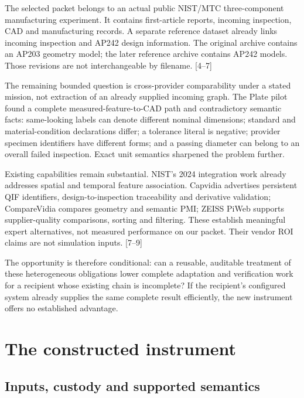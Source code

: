 \documentclass[
  11pt,
]{article}
\let\OriginalSection\section
\renewcommand{\section}{\needspace{5\baselineskip}\OriginalSection}
\let\OriginalSubsection\subsection
\renewcommand{\subsection}{\needspace{6\baselineskip}\OriginalSubsection}
\begin{document}
The selected packet belongs to an actual public NIST/MTC three-component
manufacturing experiment. It contains first-article reports, incoming
inspection, CAD and manufacturing records. A separate reference dataset
already links incoming inspection and AP242 design information. The
original archive contains an AP203 geometry model; the later reference
archive contains AP242 models. Those revisions are not interchangeable
by filename. {[}4--7{]}

The remaining bounded question is cross-provider comparability under a
stated mission, not extraction of an already supplied incoming graph.
The Plate pilot found a complete measured-feature-to-CAD path and
contradictory semantic facts: same-looking labels can denote different
nominal dimensions; standard and material-condition declarations differ;
a tolerance literal is negative; provider specimen identifiers have
different forms; and a passing diameter can belong to an overall failed
inspection. Exact unit semantics sharpened the problem further.

Existing capabilities remain substantial. NIST's 2024 integration work
already addresses spatial and temporal feature association. Capvidia
advertises persistent QIF identifiers, design-to-inspection traceability
and derivative validation; CompareVidia compares geometry and semantic
PMI; ZEISS PiWeb supports supplier-quality comparisons, sorting and
filtering. These establish meaningful expert alternatives, not measured
performance on our packet. Their vendor ROI claims are not simulation
inputs. {[}7--9{]}

The opportunity is therefore conditional: can a reusable, auditable
treatment of these heterogeneous obligations lower complete adaptation
and verification work for a recipient whose existing chain is
incomplete? If the recipient's configured system already supplies the
same complete result efficiently, the new instrument offers no
established advantage.

\hypertarget{the-constructed-instrument}{%
\section{The constructed instrument}\label{the-constructed-instrument}}

\hypertarget{inputs-custody-and-supported-semantics}{%
\subsection{Inputs, custody and supported
semantics}\label{inputs-custody-and-supported-semantics}}
\end{document}
